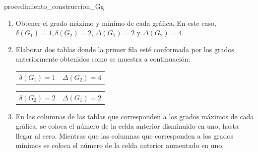 \documentclass[fleqn, 11pt]{article}
\begin{document}
\begin{ejemplo}[breakable, pad at break = 4mm, beforeafter skip = 3mm]{}{procedimiento_construccion_Gg}
        \begin{enumerate}
            \item Obtener el grado máximo y mínimo de cada gráfica. En este caso, $ \delta(G_1) = 1, \delta(G_2) = 2 $, \mbox{$ \Delta(G_1) = 2 $} y $ \Delta(G_2) = 4 $. \vspace{3mm}
            \item Elaborar dos tablas donde la primer fila esté conformada por los grados anteriormente obtenidos como se muestra a continuación: \vspace{3mm}
            
            \begin{center}
                \begin{minipage}[h]{0.3\linewidth}
                    \begin{tcolorbox}[title empty, center, colframe = black!99!white, colback = white, sharp corners, hbox, left = -0.9mm, right = -0.9mm, top = -0.9mm, bottom = -0.9mm]
                        \begin{tabular}{c|c}
                            \rowcolor{gray!36!white} 
                            $ \delta(G_1) = 1 $ & $ \Delta(G_2) = 4 $ 
                        \end{tabular}
                    \end{tcolorbox}
                \end{minipage}
                \begin{minipage}[h]{0.3\linewidth}
                    \begin{tcolorbox}[title empty, center, colframe = black!99!white, colback = white, sharp corners, hbox, left = -0.9mm, right = -0.9mm, top = -0.9mm, bottom = -0.9mm]
                        \begin{tabular}{c|c}
                            \rowcolor{gray!36!white} 
                            $ \delta(G_2) = 2 $ & $ \Delta(G_1) = 2 $ 
                        \end{tabular}
                    \end{tcolorbox}
                \end{minipage}
            \end{center} \vspace{3mm}
            
            \item En las columnas de las tablas que corresponden a los grados máximos de cada gráfica, se coloca el número de la celda anterior disminuido en uno, hasta llegar al cero. Mientras que las columnas que corresponden a los grados mínimos se coloca el número de la celda anterior aumentado en uno. \vspace{3mm}
            

\end{enumerate}
\end{ejemplo}
\end{document}
